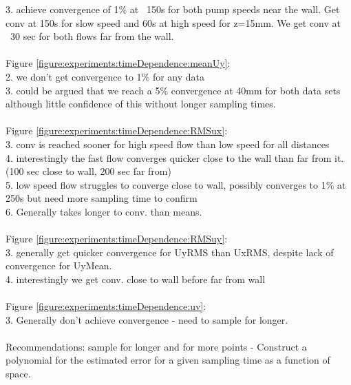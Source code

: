 \documentclass[12pt,oneside,a4paper]{article}
\begin{document}
3.	achieve convergence of 1\% at ~150s for both pump speeds near the wall. Get conv at 150s for slow speed and 60s at high speed for z=15mm. We get conv at ~30 sec for both flows far from the wall. \\
\\
Figure \ref{figure:experiments:timeDependence:meanUy}:\\
2.	we don't get convergence to 1\% for any data\\
3.	could be argued that we reach a 5\% convergence at 40mm for both data sets although little confidence of this without longer sampling times. \\
\\
Figure \ref{figure:experiments:timeDependence:RMSux}:\\
3.	conv is reached sooner for high speed flow than low speed for all distances\\
4.	interestingly the fast flow converges quicker close to the wall than far from it. (100 sec close to wall, 200 sec far from)\\
5.	low speed flow struggles to converge close to wall, possibly converges to 1\% at 250s but need more sampling time to confirm\\
6.	Generally takes longer to conv. than means.\\
\\
Figure \ref{figure:experiments:timeDependence:RMSuy}:\\
3.	generally get quicker convergence for UyRMS than UxRMS, despite lack of convergence for UyMean.\\
4.	interestingly we get conv. close to wall before far from wall
\\\\
Figure \ref{figure:experiments:timeDependence:uv}:\\
3.	Generally don't achieve convergence - need to sample for longer.\\
\\
Recommendations: sample for longer and for more points
-	Construct a polynomial for the estimated error for a given sampling time as a function of space.
\end{document}
